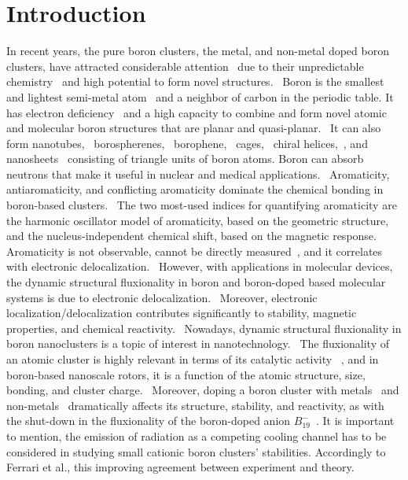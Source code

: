 \documentclass[prb,aps,preprint,showkeys,showpacs]{revtex4}
\begin{document}
\section{Introduction}
In recent years, the pure boron clusters, the metal, and non-metal doped boron clusters, have attracted considerable attention~\cite{Jalife,Wang,Sun,Jian,Teng-Teng,Gerardo,Dongliang,Peifang,Grande-Aztatzi,Dong} due to their unpredictable chemistry~\cite{Brothers,Axtell} and high potential to form novel structures.~\cite{Lai-Sheng5} Boron is the smallest and lightest semi-metal atom~\cite{Dongliang,Mannix} and a neighbor of carbon in the periodic table. It has electron deficiency~\cite{Vast,Peculiar,Hongxiao,Lai-Sheng5}  and a high capacity to combine and form novel atomic and molecular boron structures that are planar and quasi-planar.~\cite{Lai-Sheng,Lai-Sheng2,Lai-Sheng3} It can also form nanotubes,~\cite{Lai-Sheng4,Lai-Sheng5} borospherenes,~\cite{Qiang,Wang,Ying-Jin-Wang} borophene,~\cite{Wang} cages,~\cite{Lv} chiral helices,~\cite{Feng,Guo}, and nanosheets~\cite{Lai-Sheng,Mannix1513,Jimenez-Halla} consisting of triangle units of boron atoms. Boron can absorb neutrons that make it useful in nuclear and medical applications.~\cite{Barney,Lesnikowski,Ali,Lu}  Aromaticity, antiaromaticity, and conflicting aromaticity dominate the chemical bonding in boron-based clusters.~\cite{Ofelia,Alexandrova2,Feng,Boldyrev} The two most-used indices for quantifying aromaticity are the harmonic oscillator model of aromaticity, based on the geometric structure, and the nucleus-independent chemical shift, based on the magnetic response.
{{Aromaticity is not observable, cannot be directly measured~\cite{Poater}, and it correlates with electronic delocalization.~\cite{Mandado}}}
However, with applications in molecular devices, the dynamic structural fluxionality in boron and boron-doped based molecular systems is due to electronic delocalization.~\cite{Feng,Sudip2} Moreover, electronic localization/delocalization contributes significantly to stability, magnetic properties, and chemical reactivity.~\cite{Poater} Nowadays, dynamic structural fluxionality in boron nanoclusters is a topic of interest in nanotechnology.~\cite{Ying-Jin-Wang,Zhai} {{The fluxionality of an atomic cluster is highly relevant in terms of its catalytic activity ~\cite{Zhai2}, and in boron-based nanoscale rotors, it is a function of the atomic structure, size, bonding, and cluster charge.~\cite{Merino}}}
Moreover, doping a boron cluster with metals~\cite{Romanescu,Sun,Liang,Teng-Teng,Teng-Teng3,Dong2019,Popov2015} and non-metals~\cite{Duong} dramatically affects its structure, stability, and reactivity, as with the shut-down in the fluxionality of the boron-doped anion $B^{-}_{19}$~\cite{Cervantes-Navarro}.{{ It is important to mention, the emission of radiation as a competing cooling channel has to be considered in studying small cationic boron clusters' stabilities. Accordingly to Ferrari et al., this improving agreement between experiment and theory.}~\cite{Ferrari}} 
\end{document}
